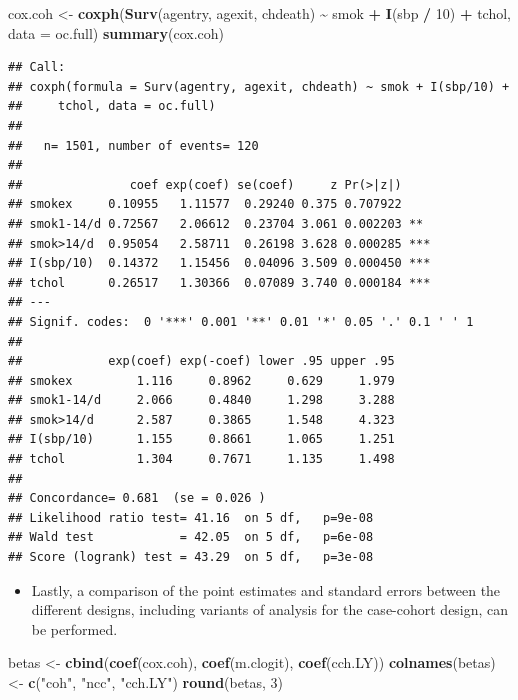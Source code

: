 \documentclass[
]{book}
\newenvironment{Shaded}{\begin{snugshade}}{\end{snugshade}}
\newcommand{\AttributeTok}[1]{\textcolor[rgb]{0.13,0.29,0.53}{#1}}
\newcommand{\DecValTok}[1]{\textcolor[rgb]{0.00,0.00,0.81}{#1}}
\newcommand{\FunctionTok}[1]{\textcolor[rgb]{0.13,0.29,0.53}{\textbf{#1}}}
\newcommand{\NormalTok}[1]{#1}
\newcommand{\OtherTok}[1]{\textcolor[rgb]{0.56,0.35,0.01}{#1}}
\newcommand{\SpecialCharTok}[1]{\textcolor[rgb]{0.81,0.36,0.00}{\textbf{#1}}}
\newcommand{\StringTok}[1]{\textcolor[rgb]{0.31,0.60,0.02}{#1}}
\providecommand{\tightlist}{%
  \setlength{\itemsep}{0pt}\setlength{\parskip}{0pt}}
\begin{document}
\begin{Shaded}
\begin{Highlighting}[]
\NormalTok{cox.coh }\OtherTok{\textless{}{-}} \FunctionTok{coxph}\NormalTok{(}\FunctionTok{Surv}\NormalTok{(agentry, agexit, chdeath) }\SpecialCharTok{\textasciitilde{}}
\NormalTok{  smok }\SpecialCharTok{+} \FunctionTok{I}\NormalTok{(sbp }\SpecialCharTok{/} \DecValTok{10}\NormalTok{) }\SpecialCharTok{+}\NormalTok{ tchol, }\AttributeTok{data =}\NormalTok{ oc.full)}
\FunctionTok{summary}\NormalTok{(cox.coh)}
\end{Highlighting}
\end{Shaded}

\begin{verbatim}
## Call:
## coxph(formula = Surv(agentry, agexit, chdeath) ~ smok + I(sbp/10) + 
##     tchol, data = oc.full)
## 
##   n= 1501, number of events= 120 
## 
##               coef exp(coef) se(coef)     z Pr(>|z|)    
## smokex     0.10955   1.11577  0.29240 0.375 0.707922    
## smok1-14/d 0.72567   2.06612  0.23704 3.061 0.002203 ** 
## smok>14/d  0.95054   2.58711  0.26198 3.628 0.000285 ***
## I(sbp/10)  0.14372   1.15456  0.04096 3.509 0.000450 ***
## tchol      0.26517   1.30366  0.07089 3.740 0.000184 ***
## ---
## Signif. codes:  0 '***' 0.001 '**' 0.01 '*' 0.05 '.' 0.1 ' ' 1
## 
##            exp(coef) exp(-coef) lower .95 upper .95
## smokex         1.116     0.8962     0.629     1.979
## smok1-14/d     2.066     0.4840     1.298     3.288
## smok>14/d      2.587     0.3865     1.548     4.323
## I(sbp/10)      1.155     0.8661     1.065     1.251
## tchol          1.304     0.7671     1.135     1.498
## 
## Concordance= 0.681  (se = 0.026 )
## Likelihood ratio test= 41.16  on 5 df,   p=9e-08
## Wald test            = 42.05  on 5 df,   p=6e-08
## Score (logrank) test = 43.29  on 5 df,   p=3e-08
\end{verbatim}

\begin{itemize}
\tightlist
\item
  Lastly, a comparison of the point estimates and standard errors between
  the different designs, including variants of analysis for the case-cohort design, can be performed.
\end{itemize}

\begin{Shaded}
\begin{Highlighting}[]
\NormalTok{betas }\OtherTok{\textless{}{-}} \FunctionTok{cbind}\NormalTok{(}\FunctionTok{coef}\NormalTok{(cox.coh), }\FunctionTok{coef}\NormalTok{(m.clogit), }\FunctionTok{coef}\NormalTok{(cch.LY))}
\FunctionTok{colnames}\NormalTok{(betas) }\OtherTok{\textless{}{-}} \FunctionTok{c}\NormalTok{(}\StringTok{"coh"}\NormalTok{, }\StringTok{"ncc"}\NormalTok{, }\StringTok{"cch.LY"}\NormalTok{)}
\FunctionTok{round}\NormalTok{(betas, }\DecValTok{3}\NormalTok{)}
\end{Highlighting}
\end{Shaded}
\end{document}
